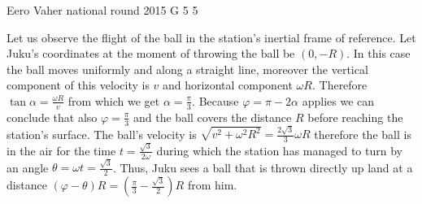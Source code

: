 \documentclass[11pt]{article}
\begin{document}
{Eero Vaher} %
{national round} %
{2015} %
{G 5} %
{5} %
{

\ifEngSolution
Let us observe the flight of the ball in the station’s inertial frame of reference. Let Juku’s coordinates at the moment of throwing the ball be $(0,-R)$. In this case the ball moves uniformly and along a straight line, moreover the vertical component of this velocity is $v$ and horizontal component $\omega R$. Therefore $\tan\alpha=\frac{\omega R}{v}$ from which we get $\alpha=\frac{\pi}{3}$. Because $\varphi=\pi-2\alpha$ applies we can conclude that also $\varphi=\frac{\pi}{3}$ and the ball covers the distance $R$ before reaching the station’s surface. The ball’s velocity is $\sqrt{v^2+\omega^2R^2}=\frac{2\sqrt{3}}{3}\omega R$ therefore the ball is in the air for the time $t=\frac{\sqrt{3}}{2\omega}$ during which the station has managed to turn by an angle $\theta=\omega t=\frac{\sqrt{3}}{2}$. Thus, Juku sees a ball that is thrown directly up land at a distance $\left(\varphi-\theta\right)R=\left(\frac{\pi}{3}-\frac{\sqrt{3}}{2}\right)R$ from him.
\begin{center}
\end{center}
\fi
}
\end{document}
